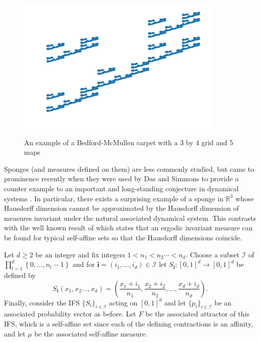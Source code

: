 \begin{figure}[h]
	\centering
	\includegraphics[width=0.8\linewidth]{pics/ch-upper-reg/self-affine-ex.png}
	\label{ch-upper-reg:fig:example-self-affine}
	\caption{An example of a Bedford-McMullen carpet with a 3 by 4 grid and 5 maps}
\end{figure}


Sponges (and measures defined on them) are less commonly studied, but came to prominence recently when they were used by Das and Simmons to provide a counter example to an important and long-standing conjecture in dynamical systems \cite{das-simmons}. In particular, there exists a surprising example of a sponge in $\mathbb{R}^3$ whose Hausdorff dimension cannot be approximated by the Hausdorff dimension of measures invariant under the natural associated dynamical system. This contrasts with the well known result of \cite{kaenmaki-affine} which states that an ergodic invariant measure can be found for typical self-affine sets so that the Hausdorff dimensions coincide.


Let $d \geq 2$ be an integer and fix integers $1<n_1 < n_2 \cdots < n_d$.  Choose a subset $\mathcal{I}$ of $\prod_{l=1}^{d} \left\lbrace 0,\ldots, n_l-1 \right\rbrace$ and for $\textbf{i}=(i_1, \ldots, i_d)\in \mathcal{I} $  let $S_{\textbf{i}} \colon [0,1]^d \rightarrow [0,1]^d$ be defined by
\[
S_{\textbf{i}}(x_1,x_2\ldots, x_d)= \left( \frac{x_1+i_1}{n_1}, \frac{x_2+i_2}{n_2}, \ldots, \frac{x_d+i_d}{n_d} \right) .
\]
Finally, consider the IFS $\{S_i\}_{i \in \mathcal{I}}$  acting on $[0,1]^d$ and let $\{p_i\}_{i \in \mathcal{I}}$ be an associated probability vector as before.  Let $F$ be the associated attractor of this IFS, which is a self-affine set since each of the defining contractions is an affinity, and let $\mu$ be the associated self-affine measure. 




